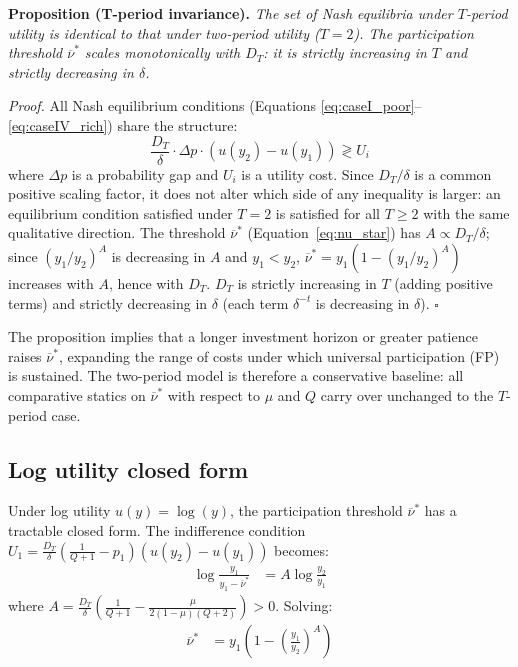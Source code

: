\documentclass[
    oneside,
    fontsize=10pt,leqno]{article}
\begin{document}
\medskip
\noindent\textbf{Proposition (T-period invariance).} \textit{The
set of Nash equilibria under $T$-period utility is identical to
that under two-period utility ($T=2$). The participation threshold
$\overline{\nu}^{*}$ scales monotonically with $D_{T}$: it is
strictly increasing in $T$ and strictly decreasing in $\delta$.}

\medskip
\noindent\textit{Proof.} All Nash equilibrium conditions (Equations
\ref{eq:caseI_poor}--\ref{eq:caseIV_rich}) share the structure:
\[
\frac{D_{T}}{\delta}\cdot\Delta p\cdot(u(y_{2})-u(y_{1}))\gtrless U_{i}
\]
where $\Delta p$ is a probability gap and $U_{i}$ is a utility
cost. Since $D_{T}/\delta$ is a common positive scaling factor,
it does not alter which side of any inequality is larger: an equilibrium
condition satisfied under $T=2$ is satisfied for all $T\geq2$ with
the same qualitative direction. The threshold $\overline{\nu}^{*}$
(Equation~\ref{eq:nu_star}) has $A\propto D_{T}/\delta$; since
$(y_{1}/y_{2})^{A}$ is decreasing in $A$ and $y_{1}<y_{2}$,
$\overline{\nu}^{*}=y_{1}(1-(y_{1}/y_{2})^{A})$ increases with
$A$, hence with $D_{T}$. $D_{T}$ is strictly increasing in $T$
(adding positive terms) and strictly decreasing in $\delta$ (each
term $\delta^{-t}$ is decreasing in $\delta$). $\square$

\medskip
The proposition implies that a longer investment horizon or greater
patience raises $\overline{\nu}^{*}$, expanding the range of costs
under which universal participation (FP) is sustained. The
two-period model is therefore a conservative baseline: all comparative
statics on $\overline{\nu}^{*}$ with respect to $\mu$ and $Q$
carry over unchanged to the $T$-period case.


\subsection*{Log utility closed form}

Under log utility $u(y)=\log(y)$, the participation threshold
$\overline{\nu}^{*}$ has a tractable closed form. The indifference
condition $U_{1}=\frac{D_{T}}{\delta}\left(\frac{1}{Q+1}-p_{1}\right)(u(y_{2})-u(y_{1}))$
becomes:
\begin{align}
\log\frac{y_{1}}{y_{1}-\overline{\nu}^{*}} & =A\log\frac{y_{2}}{y_{1}}
\end{align}
where $A=\frac{D_{T}}{\delta}\left(\frac{1}{Q+1}-\frac{\mu}{2(1-\mu)(Q+2)}\right)>0$.
Solving:
\begin{align}
\overline{\nu}^{*} & =y_{1}\left(1-\left(\frac{y_{1}}{y_{2}}\right)^{A}\right)\label{eq:nu_star}
\end{align}
\end{document}
